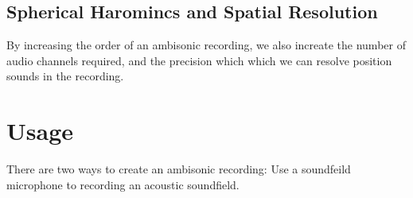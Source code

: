 \subsection{Spherical Haromincs and Spatial Resolution}
\label{sec:spatial-resolution}
By increasing the order of an ambisonic recording, we also increate
the number of audio channels required, and the precision which which
we can resolve position sounds in the recording.


\section{Usage}
\label{sec:usage}
There are two ways to create an ambisonic recording: Use a soundfeild
microphone to recording an acoustic soundfield. 


